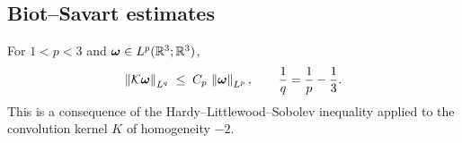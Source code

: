\subsection{Biot--Savart estimates}

\begin{proposition}\label{prop:bs-Lp}
  For $1 < p < 3$ and $\boldsymbol{\omega} \in L^{p}(\mathbb{R}^3;\mathbb{R}^3)$,
  \begin{equation}\label{eq:bs-Lp}
    \left\lVert \mathcal{K}\boldsymbol{\omega} \right\rVert_{L^{q}} \;\leq\; C_{p}\,\left\lVert \boldsymbol{\omega} \right\rVert_{L^{p}},
    \qquad \frac{1}{q} = \frac{1}{p} - \frac{1}{3}.
  \end{equation}
  This is a consequence of the Hardy--Littlewood--Sobolev inequality applied to the
  convolution kernel $K$ of homogeneity $-2$.
\end{proposition}

